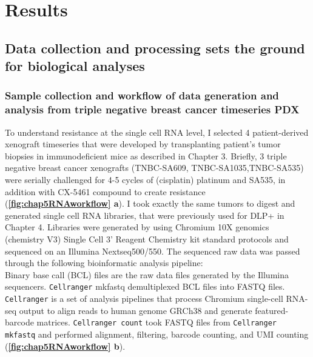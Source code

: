 \section{Results}
 
\subsection{Data collection and processing sets the ground for biological analyses} 
  
\subsubsection{Sample collection and workflow of data generation and analysis from triple negative breast cancer timeseries PDX}
To understand resistance at the single cell RNA level, I selected 4 patient-derived xenograft timeseries that were developed by transplanting patient's tumor biopsies in immunodeficient mice as described in Chapter 3. 
Briefly, 3 triple negative breast cancer xenografts (TNBC-SA609, TNBC-SA1035,TNBC-SA535) were serially challenged for 4-5 cycles of (cisplatin) platinum and SA535, in addition with CX-5461 compound to create resistance (\textbf{\autoref{fig:chap5RNAworkflow} a}).
 I took exactly the same tumors to digest and generated single cell RNA libraries, that were previously used for DLP+ in Chapter 4. Libraries were generated by using Chromium 10X genomics (chemistry V3) Single Cell 3' Reagent Chemistry kit standard protocols and sequenced on an Illumina Nextseq500/550. The sequenced raw data was passed through the following bioinformatic analysis pipeline: 
\\
Binary base call (BCL) files are the raw data files generated by the Illumina sequencers. \texttt{Cellranger} mkfastq demultiplexed BCL files into FASTQ files. \texttt{Cellranger} is a set of analysis pipelines that process Chromium single-cell RNA-seq output to align reads to human genome GRCh38 and generate featured-barcode matrices. \texttt{Cellranger count} took FASTQ files from \texttt{Cellranger mkfastq} and performed alignment, filtering, barcode counting, and UMI counting (\textbf{\autoref{fig:chap5RNAworkflow} b}). 

